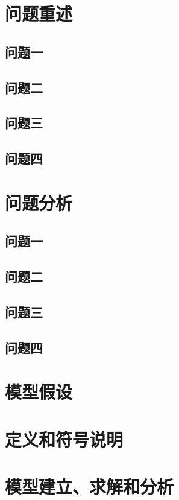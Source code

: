 \documentclass[UTF8]{ctexart}
\begin{document}
	
	\setlength{\baselineskip}{20pt}
	 \songti
	
	\tableofcontents
	\newpage
	
	\section{问题重述}
	\subsection{问题一}
	\subsection{问题二}
	\subsection{问题三}
	\subsection{问题四}
	
	\section{问题分析}
	\subsection{问题一}
	\subsection{问题二}
	\subsection{问题三}
	\subsection{问题四}
	
	\section{模型假设}
	
	\section{定义和符号说明}
	
	\section{模型建立、求解和分析}
\end{document}
